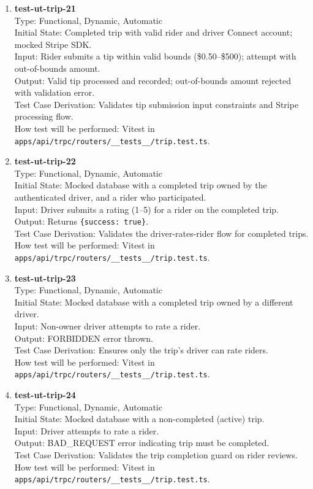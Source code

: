 \documentclass[12pt, titlepage]{article}
\begin{document}
\begin{enumerate}
\item \textbf{test-ut-trip-21}\\
Type: Functional, Dynamic, Automatic\\
Initial State: Completed trip with valid rider and driver Connect account; mocked Stripe SDK.\\
Input: Rider submits a tip within valid bounds (\$0.50--\$500); attempt with out-of-bounds amount.\\
Output: Valid tip processed and recorded; out-of-bounds amount rejected with validation error.\\
Test Case Derivation: Validates tip submission input constraints and Stripe processing flow.\\
How test will be performed: Vitest in \texttt{apps/api/trpc/routers/\_\_tests\_\_/trip.test.ts}.\\

\item \textbf{test-ut-trip-22}\\
Type: Functional, Dynamic, Automatic\\
Initial State: Mocked database with a completed trip owned by the authenticated driver, and a rider who participated.\\
Input: Driver submits a rating (1--5) for a rider on the completed trip.\\
Output: Returns \texttt{\{success: true\}}.\\
Test Case Derivation: Validates the driver-rates-rider flow for completed trips.\\
How test will be performed: Vitest in \texttt{apps/api/trpc/routers/\_\_tests\_\_/trip.test.ts}.\\

\item \textbf{test-ut-trip-23}\\
Type: Functional, Dynamic, Automatic\\
Initial State: Mocked database with a completed trip owned by a different driver.\\
Input: Non-owner driver attempts to rate a rider.\\
Output: FORBIDDEN error thrown.\\
Test Case Derivation: Ensures only the trip's driver can rate riders.\\
How test will be performed: Vitest in \texttt{apps/api/trpc/routers/\_\_tests\_\_/trip.test.ts}.\\

\item \textbf{test-ut-trip-24}\\
Type: Functional, Dynamic, Automatic\\
Initial State: Mocked database with a non-completed (active) trip.\\
Input: Driver attempts to rate a rider.\\
Output: BAD\_REQUEST error indicating trip must be completed.\\
Test Case Derivation: Validates the trip completion guard on rider reviews.\\
How test will be performed: Vitest in \texttt{apps/api/trpc/routers/\_\_tests\_\_/trip.test.ts}.\\


\end{enumerate}
\end{document}
